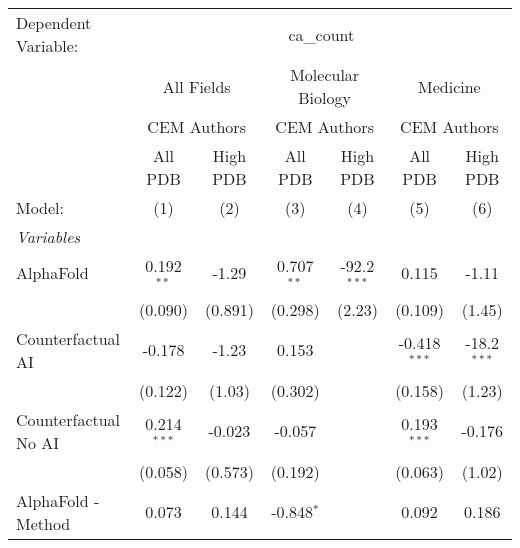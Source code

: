 \begingroup
\centering
\begin{tabular}{lcccccc}
   \tabularnewline \midrule \midrule
   Dependent Variable: & \multicolumn{6}{c}{ca\_count}\\
 & \multicolumn{2}{c}{All Fields} & \multicolumn{2}{c}{Molecular Biology} & \multicolumn{2}{c}{Medicine} \\
\cmidrule(lr){2-3} \cmidrule(lr){4-5} \cmidrule(lr){6-7}
 & \multicolumn{2}{c}{CEM Authors} & \multicolumn{2}{c}{CEM Authors} & \multicolumn{2}{c}{CEM Authors} \\
\cmidrule(lr){2-3} \cmidrule(lr){4-5} \cmidrule(lr){6-7}
 & \multicolumn{1}{c}{All PDB} & \multicolumn{1}{c}{High PDB} & \multicolumn{1}{c}{All PDB} & \multicolumn{1}{c}{High PDB} & \multicolumn{1}{c}{All PDB} & \multicolumn{1}{c}{High PDB} \\
\cmidrule(lr){2-2} \cmidrule(lr){3-3} \cmidrule(lr){4-4} \cmidrule(lr){5-5} \cmidrule(lr){6-6} \cmidrule(lr){7-7}
   Model:                                                     & (1)           & (2)          & (3)           & (4)           & (5)            & (6)\\  
   \midrule
   \emph{Variables}\\
   AlphaFold                                                  & 0.192$^{**}$  & -1.29        & 0.707$^{**}$  & -92.2$^{***}$ & 0.115          & -1.11\\   
                                                              & (0.090)       & (0.891)      & (0.298)       & (2.23)        & (0.109)        & (1.45)\\   
   Counterfactual AI                                          & -0.178        & -1.23        & 0.153         &               & -0.418$^{***}$ & -18.2$^{***}$\\   
                                                              & (0.122)       & (1.03)       & (0.302)       &               & (0.158)        & (1.23)\\   
   Counterfactual No AI                                       & 0.214$^{***}$ & -0.023       & -0.057        &               & 0.193$^{***}$  & -0.176\\   
                                                              & (0.058)       & (0.573)      & (0.192)       &               & (0.063)        & (1.02)\\   
   AlphaFold - Method                                         & 0.073         & 0.144        & -0.848$^{*}$  &               & 0.092          & 0.186\\   

\end{tabular}
